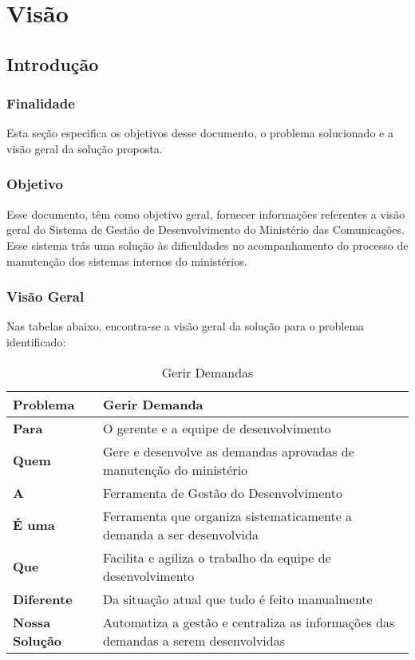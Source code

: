 \chapter[Visão]{Visão}

\section{Introdução}

\subsection{Finalidade}

Esta seção especifica os objetivos desse documento, o problema solucionado e a visão geral da solução proposta.

\subsection{Objetivo}

Esse documento, têm como objetivo geral, fornecer informações referentes a visão geral do Sistema de Gestão de Desenvolvimento do Ministério das Comunicações. Esse sistema trás uma solução às dificuldades no acompanhamento do processo de manutenção dos sistemas internos do ministérios.

\subsection{Visão Geral}

Nas tabelas abaixo, encontra-se a visão geral da solução para o problema identificado:

\begin{table}[H]
\begin{tabular}{|l| p{11cm} |}
	\hline
	\textbf{Problema} & Gerir Demanda\tabularnewline
	\hline
	\textbf{Para} & O gerente e a equipe de desenvolvimento \tabularnewline
	\hline
	\textbf{Quem} & Gere e desenvolve as demandas aprovadas de manutenção do ministério\tabularnewline
	\hline
	\textbf{A} & Ferramenta de Gestão do Desenvolvimento\tabularnewline
	\hline
	\textbf{É uma} & Ferramenta que organiza sistematicamente a demanda a ser desenvolvida\tabularnewline
	\hline
	\textbf{Que} & Facilita e agiliza o trabalho da equipe de desenvolvimento\tabularnewline
	\hline
	\textbf{Diferente} & Da situação atual que tudo é feito manualmente\tabularnewline
	\hline
	\textbf{Nossa Solução} & Automatiza a gestão e centraliza as informações das demandas a serem desenvolvidas\tabularnewline
	\hline
\end{tabular}
\caption{Gerir Demandas}
\label{Visao_Geral_Gerir_Demandas}
\end{table}

